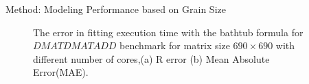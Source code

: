 \documentclass[10pt]{beamer}
\begin{document}
\begin{frame}{Method: Modeling Performance based on Grain Size}
	\begin{outline}
		\begin{figure}[H]
			\centering
			\caption{The error in fitting execution time with the bathtub formula for $DMATDMATADD$ benchmark for matrix size $690\times690$ with different number of cores,(a) R error (b) Mean Absolute Error(MAE).}	
			\label{fig38}
		\end{figure}
	\end{outline}
\end{frame}

\end{document}

